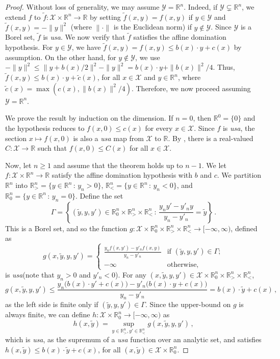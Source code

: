 \documentclass[10pt,a4paper]{amsart}
\newcommand{\R}{\mathbb R}
\newcommand{\X}{\mathcal X}
\newcommand{\Y}{\mathcal Y}
\newcommand{\usa}{\emph{usa}\xspace}
\begin{document}
\begin{proof}
    Without loss of generality, we may assume $\Y = \mathbb R^n$. Indeed, if $\Y \subsetneq \mathbb R^n$, we extend $f$ to $\tilde{f}: \X \times \mathbb R^n \to \R$ by setting $\tilde{f}(x,y) = f(x,y)$ if $y \in \Y$ and $\tilde{f}(x,y) = -\|y\|^2$ (where $\|\cdot\|$ is the Euclidean norm) if $y \notin \Y$. Since $\Y$ is a Borel set, $\tilde{f}$ is \usa. We now verify that $\tilde{f}$ satisfies the affine domination hypothesis. For $y \in \Y$, we have $\tilde{f}(x,y) = f(x,y) \leq b(x)\cdot y + c(x)$ by assumption. On the other hand, for $y \notin \Y$, we use $-\|y\|^2 \leq \|y + b(x)/2\|^2 - \|y\|^2 =  b(x)\cdot y + \|b(x)\|^2/4$. Thus, $\tilde{f}(x,y) \le b(x)\cdot y + \tilde{c}(x)$, for all $x\in\X$ and $y\in\R^n$, where $\tilde{c}(x) = \max(c(x), \|b(x)\|^2/4)$. Therefore, we now proceed assuming $\Y = \mathbb R^n$.

    We prove the result by induction on the dimension. If $n=0$, then $\R^0 = \{0\}$ and the hypothesis  reduces to $f(x,0)\leq c(x)$ for every $x\in\X$. Since $f$ is \usa, the section $x\mapsto f(x,0)$ is also a \usa map from $\X$ to $\R$. By , there is a real-valued $C:\X\to\R$ such that  $f(x,0)\leq C(x)$ for all $x\in\X$. 

    Now, let $n\geq 1$ and assume that the theorem holds up to $n-1$. We let $f:\X\times \R^n\to\R$  satisfy the affine domination hypothesis with $b$ and $c$.  
    We partition $\R^n$ into $\R^n_> = \{y\in \R^n\,:\,y_n>0\}$, $\R^n_<=\{y\in \R^n\,:\,y_n<0\}$, and $\R^n_0 = \{y\in \R^n\,:\,y_n=0\}$. Define the set 
    $$\Gamma = \left\{(\tilde y, y, y')\in \R^n_0\times \R^n_>\times \R^n_<\,:\,\frac{y_{n} y' - y'_{n} y}{y_{n}-y'_{n}} = \tilde y\right\}\,.$$ This is a Borel set, and so the function $g:\X\times \R^n_0\times \R^n_>\times \R^n_<\to[-\infty,\infty)$, defined as 
    $$g(x,\tilde y, y, y') = \begin{cases}
    \frac{y_{n}f(x,y') - y'_{n}f(x,y)}{y_{n}-y'_{n}} & \text{if $(\tilde y, y, y')\in\Gamma$};\\-\infty & \text{otherwise,}\end{cases}$$
    is \usa (note that $y_{n}>0$ and $y'_{n}<0$). For any $(x, \tilde y, y, y')\in \X\times \R^n_0\times \R^n_>\times \R^n_<$,$$g(x, \tilde y, y, y') \leq \frac{y_{n}  \big(b(x)\cdot y'+c(x)\big) - y'_{n} \big(b(x)\cdot y+c(x)\big)}{y_{n}-y'_{n}} =   b(x) \cdot\tilde y + c(x)\,,$$  as the left side is finite only if $(\tilde y, y,y')\in\Gamma$. Since the upper-bound on $g$ is always finite, we can define $h:\X\times \R^n_0\to[-\infty,\infty)$ as  
    $$h(x,\tilde y) = \sup_{y\in \R^n_>,y'\in \R^n_<} g(x, \tilde y, y, y')\,,$$ 
    which is \usa, as the supremum of a \usa function over an analytic set, and satisfies $h(x,\tilde y)\leq b(x)\cdot \tilde y + c(x)$, for all $(x,\tilde y)\in\X\times \R^n_0$.


\end{proof}
\end{document}
